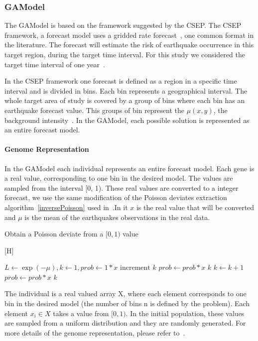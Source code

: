 \subsubsection{GAModel}\label{GAModel}
The GAModel is based on the framework suggested by the CSEP. The CSEP framework, a forecast model uses a gridded rate
forecast~\cite{zechar2010evaluating}, one common format in the
literature. The forecast will estimate the risk of earthquake occurrence in this target region, during the target time interval. For this study we considered the target time interval of one year~\cite{ecta14}.

 In the CSEP framework one forecast is defined as a region in a specific time interval and is divided in bins. Each bin represents a geographical interval. The whole target area of study is covered by a group of bins where each bin has an earthquake forecast value. This groups of bin represent the $\mu(x,y)$, the background intensity~\cite{zhuang2004analyzing}. In the GAModel, each possible solution is represented as an entire forecast model.

\paragraph{Genome Representation}\label{genomeGA}
In the GAModel each individual represents an entire forecast model. Each gene is a real value, corresponding to one bin in the desired model. The values are sampled from the interval [0, 1). These real values are converted to a integer forecast, we use the same modification of the Poisson deviates extraction algorithm~\ref{inversePoisson} used in~\cite{ecta14}.In it $x$ is the real value that will be converted and $\mu$ is the mean of the earthquakes observations in the real data.

\begin{algorithm}\label{inversePoisson}
	\caption{Obtain a Poisson deviate from a $[0,1)$ value}
	\label{InversePoisson}[H]
	\begin{algorithmic}
		\STATE $L \gets \exp{(-\mu)}, k \gets 1, prob \gets 1 * x$
		\REPEAT 
		\STATE $\text{increment }k$
		\STATE $prob \gets prob*x$
		\RETURN $k$
		\STATE $k \gets k + 1$
		\STATE $prob \gets prob*x$
		\ENDWHILE
		\RETURN $k$
	\end{algorithmic}
\end{algorithm}

The individual is a real valued array X, where each element corresponds to one bin in the desired model (the number of bins n is defined by the problem). Each element $x_i \in X$ takes a value from $[0,1)$. In the initial population, these values are sampled from a uniform distribution and they are randomly generated. For more details of the genome representation, please refer to~\cite{ecta14}.

